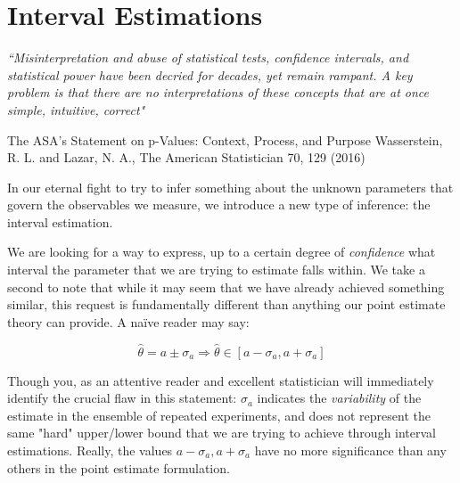 \chapter{Interval Estimations}
\label{chap:intervals}

\vspace*{2cm}

\begin{center}
	\itshape
	“Misinterpretation and abuse of statistical
	tests, confidence intervals, and statistical
	power have been decried for decades, yet
	remain rampant. A key problem is that there
	are no interpretations of these concepts
	that are at once simple, intuitive, correct"
	
	\vspace{0.5em}
	The ASA's Statement on p-Values: Context, Process, and Purpose
	Wasserstein, R. L. and Lazar, N. A., The American Statistician
	70, 129 (2016)
\end{center}

\vspace{2cm}

In our eternal fight to try to infer something about the unknown parameters that govern the observables we measure, we introduce a new type of inference: the interval estimation. 

We are looking for a way to express, up to a certain degree of \emph{confidence} what interval the parameter that we are trying to estimate falls within. We take a second to note that while it may seem that we have already achieved something similar, this request is fundamentally different than anything our point estimate theory can provide. A naïve reader may say:

	\[
	\hat\theta = a \pm \sigma_a \Rightarrow \hat\theta \in \left[a-\sigma_a, a+\sigma_a\right]
	\]

Though you, as an attentive reader and excellent statistician will immediately identify the crucial flaw in this statement: $\sigma_a$ indicates the \emph{variability} of the estimate in the ensemble of repeated experiments, and does not represent the same "hard" upper/lower bound that we are trying to achieve through interval estimations. Really, the values $a-\sigma_a, a+\sigma_a$ have no more significance than any others in the point estimate formulation.


